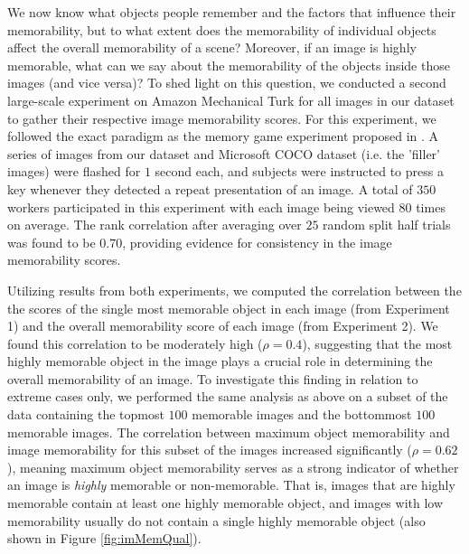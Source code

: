 We now know what objects people remember and the factors that influence their memorability, but to what extent does the memorability of individual objects affect the overall memorability of a scene? Moreover, if an image is highly memorable, what can we say about the memorability of the objects inside those images (and vice versa)? To shed light on this question, we conducted a second large-scale experiment on Amazon Mechanical Turk for all images in our dataset to gather their respective image memorability scores. For this experiment, we followed the exact paradigm as the memory game experiment proposed in \cite{isola11}. A series of images from our dataset and Microsoft COCO dataset \cite{coco14} (i.e. the 'filler' images) were flashed for $1$ second each, and subjects were instructed to press a key whenever they detected a repeat presentation of an image. A total of $350$ workers participated in this experiment with each image being viewed $80$ times on average. The rank correlation after averaging over $25$ random split half trials was found to be $0.70$, providing evidence for consistency in the image memorability scores.

Utilizing results from both experiments, we computed the correlation between the the scores of the single most memorable object in each image (from Experiment 1) and the overall memorability score of each image (from Experiment 2). We found this correlation to be moderately high ($\rho=0.4$), suggesting that the most highly memorable object in the image plays a crucial role in determining the overall memorability of an image. To investigate this finding in relation to extreme cases only, we performed the same analysis as above on a subset of the data containing the topmost $100$ memorable images and the bottommost $100$ memorable images. The correlation between maximum object memorability and image memorability for this subset of the images increased significantly ($\rho=0.62$), meaning maximum object memorability serves as a strong indicator of whether an image is \textit{highly} memorable or non-memorable. That is, images that are highly memorable contain at least one highly memorable object, and images with low memorability usually do not contain a single highly memorable object (also shown in Figure \ref{fig:imMemQual}).

